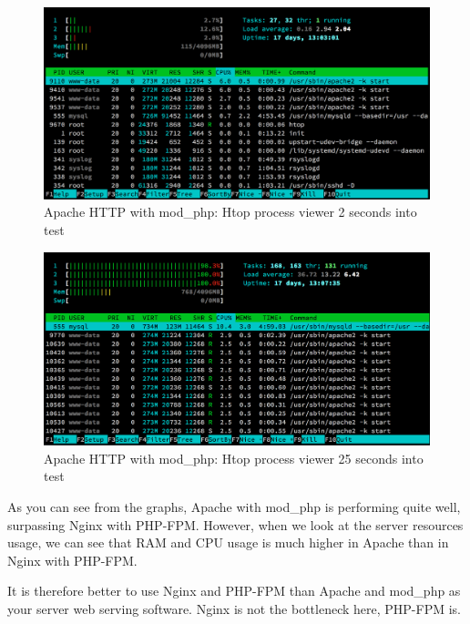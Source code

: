 \begin{figure}[H]
\begin{center}
\includegraphics[scale=0.5]{figures/Apache_mod_php_2s.png}
\caption{Apache HTTP with mod\_php: Htop process viewer 2 seconds into test}
\label{fig:apache_mod_php_2s}
\end{center}
\end{figure}

\begin{figure}[H]
\begin{center}
\includegraphics[scale=0.5]{figures/Apache_mod_php_25s.png}
\caption{Apache HTTP with mod\_php: Htop process viewer 25 seconds into test}
\label{fig:apache_mod_php_25s}
\end{center}
\end{figure}

As you can see from the graphs, Apache with mod\_php is performing quite well, surpassing Nginx with PHP-FPM. However, when we look at the server resources usage, we can see that RAM and CPU usage is much higher in Apache than in Nginx with PHP-FPM.

It is therefore better to use Nginx and PHP-FPM than Apache and mod\_php as your server web serving software. Nginx is not the bottleneck here, PHP-FPM is.


